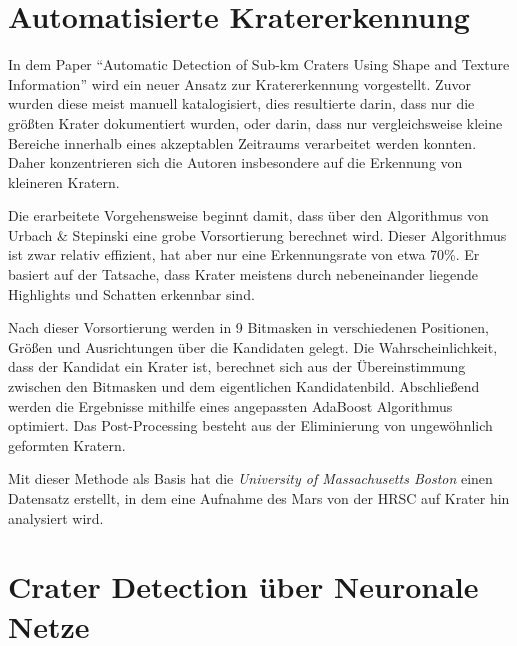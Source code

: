
\section{Automatisierte Kratererkennung}
\label{sec:bandeira}
In dem Paper \enquote{Automatic Detection of Sub-km Craters Using Shape and Texture Information}\cite{bandeira} wird ein neuer Ansatz zur Kratererkennung vorgestellt. Zuvor wurden diese meist manuell katalogisiert, dies resultierte darin, dass nur die größten Krater dokumentiert wurden, oder darin, dass nur vergleichsweise kleine Bereiche innerhalb eines akzeptablen Zeitraums verarbeitet werden konnten. Daher konzentrieren sich die Autoren insbesondere auf die Erkennung von kleineren Kratern.

Die erarbeitete Vorgehensweise beginnt damit, dass über den Algorithmus von Urbach \& Stepinski\cite{urbach2009automatic} eine grobe Vorsortierung berechnet wird. Dieser Algorithmus ist zwar relativ effizient, hat aber nur eine Erkennungsrate von etwa 70\%. Er basiert auf der Tatsache, dass Krater meistens durch nebeneinander liegende Highlights und Schatten erkennbar sind.

Nach dieser Vorsortierung werden in \cite{bandeira} 9 Bitmasken in verschiedenen Positionen, Größen und Ausrichtungen über die Kandidaten gelegt. Die Wahrscheinlichkeit, dass der Kandidat ein Krater ist, berechnet sich aus der Übereinstimmung zwischen den Bitmasken und dem eigentlichen Kandidatenbild. Abschließend werden die Ergebnisse mithilfe eines angepassten AdaBoost Algorithmus optimiert. Das Post-Processing besteht aus der Eliminierung von ungewöhnlich geformten Kratern.

Mit dieser Methode als Basis hat die \textit{University of Massachusetts Boston} einen Datensatz\cite{umass} erstellt, in dem eine Aufnahme des Mars von der HRSC\cite{neukum2004hrsc} auf Krater hin analysiert wird.



\section{Crater Detection über Neuronale Netze}
\label{sec:crater_cnn}
\cite{crater_cnn}